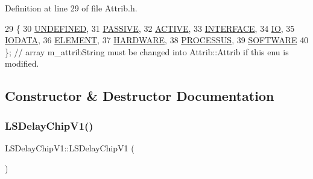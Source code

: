 Definition at line 29 of file Attrib.\+h.


\begin{DoxyCode}
29                 \{
30     \hyperlink{classAttrib_a69e171d7cc6417835a5a306d3c764235a3a8da2ab97dda18aebab196fe4100531}{UNDEFINED},
31     \hyperlink{classAttrib_a69e171d7cc6417835a5a306d3c764235a2bfb2af57b87031d190a05fe25dd92ed}{PASSIVE},
32     \hyperlink{classAttrib_a69e171d7cc6417835a5a306d3c764235a3b1fec929c0370d1436f2f06e298fb0d}{ACTIVE},
33     \hyperlink{classAttrib_a69e171d7cc6417835a5a306d3c764235aa27c16b480a369ea4d18b07b2516bbc7}{INTERFACE},
34     \hyperlink{classAttrib_a69e171d7cc6417835a5a306d3c764235a1420a5b8c0540b2af210b6975eded7f9}{IO},
35     \hyperlink{classAttrib_a69e171d7cc6417835a5a306d3c764235a0af3b0d0ac323c1704e6c69cf90add28}{IODATA},
36     \hyperlink{classAttrib_a69e171d7cc6417835a5a306d3c764235a7788bc5dd333fd8ce18562b269c9dab1}{ELEMENT},
37     \hyperlink{classAttrib_a69e171d7cc6417835a5a306d3c764235a61ceb22149f365f1780d18f9d1459423}{HARDWARE},
38     \hyperlink{classAttrib_a69e171d7cc6417835a5a306d3c764235a75250e29692496e73effca2c0330977f}{PROCESSUS},
39     \hyperlink{classAttrib_a69e171d7cc6417835a5a306d3c764235a103a67cd0b8f07ef478fa45d4356e27b}{SOFTWARE} 
40   \}; \textcolor{comment}{// array m\_attribString must be changed into Attrib::Attrib if this enu is modified. }
\end{DoxyCode}


\subsection{Constructor \& Destructor Documentation}
\mbox{\label{classLSDelayChipV1_a4dbc01a273a6e044b6f163e12e136134}} 
\subsubsection{\texorpdfstring{L\+S\+Delay\+Chip\+V1()}{LSDelayChipV1()}}
{\footnotesize\ttfamily L\+S\+Delay\+Chip\+V1\+::\+L\+S\+Delay\+Chip\+V1 (\begin{DoxyParamCaption}{ }\end{DoxyParamCaption})\hspace{0.3cm}{\ttfamily [inline]}}



